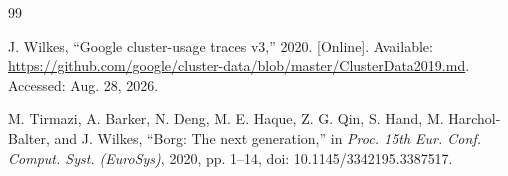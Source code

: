\documentclass{UNCC-thesis}
\begin{document}
\begin{thebibliography}{99}


J. Wilkes, ``Google cluster-usage traces v3,'' 2020. [Online]. Available:
\url{https://github.com/google/cluster-data/blob/master/ClusterData2019.md}.
Accessed: Aug. 28, 2026.

M. Tirmazi, A. Barker, N. Deng, M. E. Haque, Z. G. Qin, S. Hand,
M. Harchol-Balter, and J. Wilkes, ``Borg: The next generation,'' in
\emph{Proc. 15th Eur. Conf. Comput. Syst. (EuroSys)}, 2020, pp. 1--14,
doi: 10.1145/3342195.3387517.







\end{thebibliography}
\end{document}
